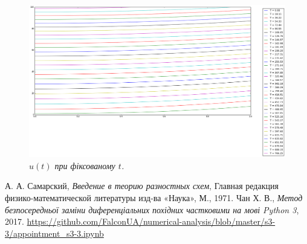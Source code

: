 \begin{figure}[h!]
  \centering
  \includegraphics[width=.9\linewidth]{res1}
  \caption{\it \( u(t)\) при фіксованому \(t\).}
\end{figure}

\begin{thebibliography}{9}

  А. А. Самарский,
  \emph{Введение в теорию разностных схем},
  Главная редакция физико-математической литературы изд-ва «Наука», 
  М., 1971. 
  Чан Х. В., \emph{Метод безпосередньої заміни диференціальних похідних частковими на мові Python 3}, 2017. 
  \url{https://github.com/FalconUA/numerical-analysis/blob/master/s3-3/appointment_s3-3.ipynb}

\end{thebibliography}
